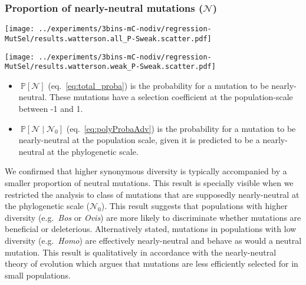 \documentclass[12pt]{article}
\newcommand{\proba}{\mathbb{P}}
\newcommand{\SphyNeu}{\mathcal{N}_0}
\newcommand{\given}{\mid}
\newcommand{\SpopNeu}{\mathcal{N}}
\begin{document}
    \subsubsection{Proportion of nearly-neutral mutations ($\SpopNeu$)}\label{subsec:proportion-nearly-neutral-mutations}
    \begin{minipage}{0.49\linewidth}
        \texttt{[image: ../experiments/3bins-mC-nodiv/regression-MutSel/results.watterson.all\_P-Sweak.scatter.pdf]}
    \end{minipage}
    \begin{minipage}{0.49\linewidth}
        \texttt{[image: ../experiments/3bins-mC-nodiv/regression-MutSel/results.watterson.weak\_P-Sweak.scatter.pdf]}
    \end{minipage}
    \begin{itemize}
        \item $\ \proba [ \SpopNeu ]$ (eq.~\ref{eq:total_proba}) is the probability for a mutation to be nearly-neutral.
        These mutations have a selection coefficient at the population-scale between -1 and 1.
        \item $\ \proba [ \SpopNeu \given \SphyNeu ]$ (eq.~\ref{eq:polyProbaAdv}) is the probability for a mutation to be nearly-neutral at the population scale, given it is predicted to be a nearly-neutral at the phylogenetic scale.
    \end{itemize}

    We confirmed that higher synonymous diversity is typically accompanied by a smaller proportion of neutral mutations.
    This result is specially visible when we restricted the analysis to class of mutations that are supposedly nearly-neutral at the phylogenetic scale ($\SphyNeu$).
    This result suggests that populations with higher diversity (e.g.~\textit{Bos} or \textit{Ovis}) are more likely to discriminate whether mutations are beneficial or deleterious.
    Alternatively stated, mutations in populations with low diversity (e.g.~\textit{Homo}) are effectively nearly-neutral and behave as would a neutral mutation.
    This result is qualitatively in accordance with the nearly-neutral theory of evolution which argues that mutations are less efficiently selected for in small populations.
\end{document}
